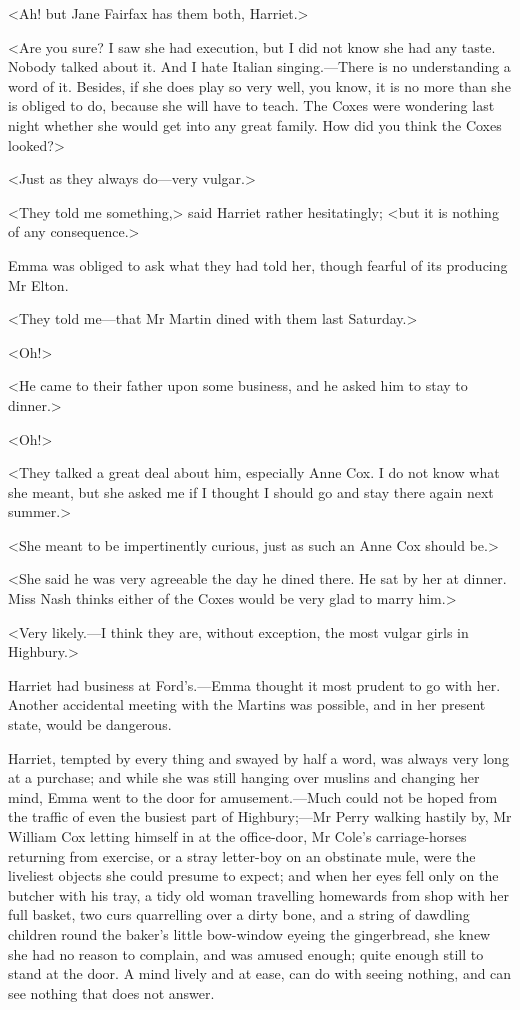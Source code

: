 <Ah! but Jane Fairfax has them both, Harriet.>

<Are you sure? I saw she had execution, but I did not know she had any taste. Nobody talked about it. And I hate Italian singing.—There is no understanding a word of it. Besides, if she does play so very well, you know, it is no more than she is obliged to do, because she will have to teach. The Coxes were wondering last night whether she would get into any great family. How did you think the Coxes looked?>

<Just as they always do—very vulgar.>

<They told me something,> said Harriet rather hesitatingly; <but it is nothing of any consequence.>

Emma was obliged to ask what they had told her, though fearful of its producing Mr Elton.

<They told me—that Mr Martin dined with them last Saturday.>

<Oh!>

<He came to their father upon some business, and he asked him to stay to dinner.>

<Oh!>

<They talked a great deal about him, especially Anne Cox. I do not know what she meant, but she asked me if I thought I should go and stay there again next summer.>

<She meant to be impertinently curious, just as such an Anne Cox should be.>

<She said he was very agreeable the day he dined there. He sat by her at dinner. Miss Nash thinks either of the Coxes would be very glad to marry him.>

<Very likely.—I think they are, without exception, the most vulgar girls in Highbury.>

Harriet had business at Ford's.—Emma thought it most prudent to go with her. Another accidental meeting with the Martins was possible, and in her present state, would be dangerous.

Harriet, tempted by every thing and swayed by half a word, was always very long at a purchase; and while she was still hanging over muslins and changing her mind, Emma went to the door for amusement.—Much could not be hoped from the traffic of even the busiest part of Highbury;—Mr Perry walking hastily by, Mr William Cox letting himself in at the office-door, Mr Cole's carriage-horses returning from exercise, or a stray letter-boy on an obstinate mule, were the liveliest objects she could presume to expect; and when her eyes fell only on the butcher with his tray, a tidy old woman travelling homewards from shop with her full basket, two curs quarrelling over a dirty bone, and a string of dawdling children round the baker's little bow-window eyeing the gingerbread, she knew she had no reason to complain, and was amused enough; quite enough still to stand at the door. A mind lively and at ease, can do with seeing nothing, and can see nothing that does not answer.

